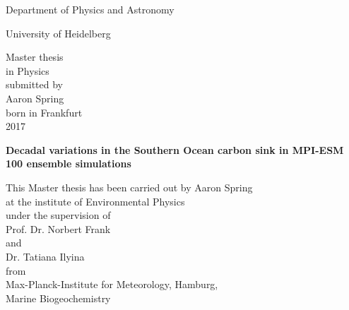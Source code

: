 \documentclass{article}
\newcommand{\myTitle}{Decadal variations in the Southern Ocean carbon sink in MPI-ESM 100 ensemble simulations\xspace}
\newcommand{\myName}{Aaron Spring\xspace}
\newcommand{\myProf}{Prof. Dr. Norbert Frank\xspace}
\newcommand{\mySecondProf}{Dr. Tatiana Ilyina\xspace}
\newcommand{\mySecondProfInstitution}{Max-Planck-Institute for Meteorology, Hamburg, \\ {Marine Biogeochemistry} \xspace}
\newcommand{\myFaculty}{Department of Physics and Astronomy\xspace}
\newcommand{\myDepartment}{Environmental Physics\xspace}
\newcommand{\myUni}{University of Heidelberg\xspace}
\newcommand{\myThesisYear}{2017}
\newcommand{\myBirthplace}{Frankfurt\xspace}
\begin{document}
%
%
    \begin{addmargin}%
    \renewcommand{\baselinestretch}{2.00}
    \begin{center}
        \Large  

		\myFaculty \\
		\smallskip
		
		\large
		\myUni

        \hfill

        \vfill

    	\medskip
		
        \vfill
		Master thesis \\ 
		in Physics \\ 
		submitted by \\ 
		\myName \\ 
		born in \myBirthplace  \\
		\myThesisYear 
        

    \end{center}  
  \end{addmargin}    

  
\clearpage
{}  
\begin{center}
  \renewcommand{\baselinestretch}{2.00}
  \Large \bfseries%
    \myTitle 
    
  \par
  \vfill
  \large\normalfont
  This Master thesis has been carried out by \myName \\
  at the institute of \myDepartment \\
  under the supervision of \\
  \myProf \\%
  and \\ 
  \mySecondProf  \\ from \\ \mySecondProfInstitution 
\end{center}\par
\vspace{5\baselineskip}
\end{document}
